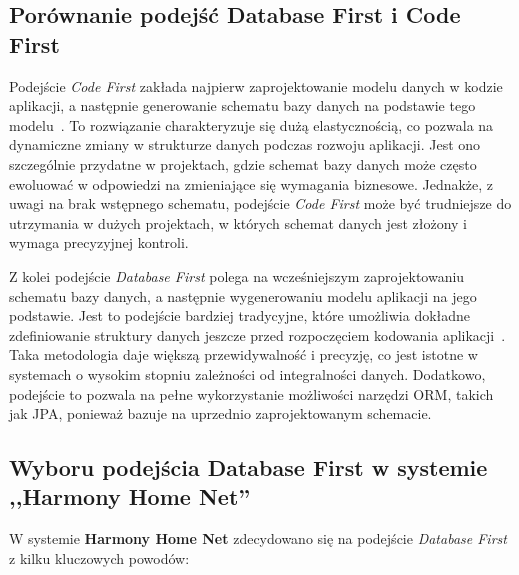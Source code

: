 \subsection{Porównanie podejść Database First i Code First}

Podejście \emph{Code First} zakłada najpierw zaprojektowanie modelu danych w kodzie aplikacji, a następnie generowanie schematu bazy danych na podstawie tego modelu~\cite{CODE_FIRST}. To rozwiązanie charakteryzuje się dużą elastycznością, co pozwala na dynamiczne zmiany w strukturze danych podczas rozwoju aplikacji. Jest ono szczególnie przydatne w projektach, gdzie schemat bazy danych może często ewoluować w odpowiedzi na zmieniające się wymagania biznesowe. Jednakże, z uwagi na brak wstępnego schematu, podejście \emph{Code First} może być trudniejsze do utrzymania w dużych projektach, w których schemat danych jest złożony i wymaga precyzyjnej kontroli.

Z kolei podejście \emph{Database First} polega na wcześniejszym zaprojektowaniu schematu bazy danych, a następnie wygenerowaniu modelu aplikacji na jego podstawie. Jest to podejście bardziej tradycyjne, które umożliwia dokładne zdefiniowanie struktury danych jeszcze przed rozpoczęciem kodowania aplikacji~\cite{DB_FIRST}. Taka metodologia daje większą przewidywalność i precyzję, co jest istotne w systemach o wysokim stopniu zależności od integralności danych. Dodatkowo, podejście to pozwala na pełne wykorzystanie możliwości narzędzi ORM, takich jak JPA, ponieważ bazuje na uprzednio zaprojektowanym schemacie.

\subsection{Wyboru podejścia Database First w systemie ,,Harmony Home Net''}

W systemie \textbf{Harmony Home Net} zdecydowano się na podejście \emph{Database First} z kilku kluczowych powodów:

